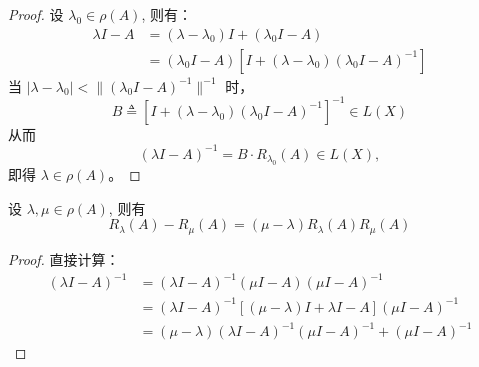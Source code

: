 \documentclass[lang=cn,newtx,10pt,scheme=chinese,thmcnt=chapter]{elegantbook}
\begin{document}
\begin{proof}
设 $\lambda_0 \in \rho(A)$, 则有：
\[
\begin{aligned}
\lambda I - A &= (\lambda - \lambda_0) I + (\lambda_0 I - A) \\
              &= (\lambda_0 I - A) \left[ I + (\lambda - \lambda_0) (\lambda_0 I - A)^{-1} \right]
\end{aligned}
\]
当 $|\lambda - \lambda_0| < \| (\lambda_0 I - A)^{-1} \|^{-1}$ 时，
\[
B \triangleq \left[ I + (\lambda - \lambda_0) (\lambda_0 I - A)^{-1} \right]^{-1} \in L(X)
\]
从而
\[
(\lambda I - A)^{-1} = B \cdot R_{\lambda_0}(A) \in L(X),
\]
即得 $\lambda \in \rho(A)$。
\end{proof}

\begin{lemma}[第一预解公式]设 $\lambda, \mu \in \rho(A)$, 则有
\[
R_\lambda(A) - R_\mu(A) = (\mu - \lambda) R_\lambda(A) R_\mu(A)
\]
\end{lemma}

\begin{proof}
直接计算：
\[
\begin{aligned}
(\lambda I - A)^{-1} &= (\lambda I - A)^{-1} (\mu I - A) (\mu I - A)^{-1} \\
                     &= (\lambda I - A)^{-1} \left[ (\mu - \lambda) I + \lambda I - A \right] (\mu I - A)^{-1} \\
                     &= (\mu - \lambda)(\lambda I - A)^{-1} (\mu I - A)^{-1} + (\mu I - A)^{-1}
\end{aligned}
\]
\end{proof}
\end{document}

